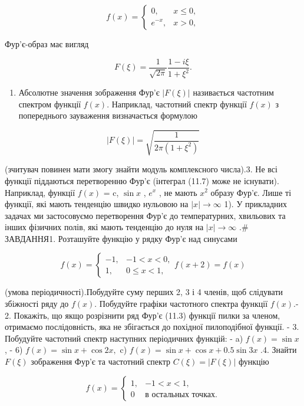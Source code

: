 \documentclass[
  ukrainian,
]{article}
\providecommand{\tightlist}{%
  \setlength{\itemsep}{0pt}\setlength{\parskip}{0pt}}
\begin{document}
\[
f(x) =
\begin{cases} 0, & x \le 0, \\ e^{-x}, & x > 0, \end{cases}
\]

Фур'є-образ має вигляд

\[
F(\xi) = \frac{1}{\sqrt{2\pi}} \frac{1 - i\xi}{1 + \xi^2}.
\]

\begin{enumerate}
\def\labelenumi{\arabic{enumi}.}
\setcounter{enumi}{1}
\tightlist
\item
  Абсолютне значення зображення Фур'є \(|F(\xi)|\) називається частотним
  спектром функції \(f(x)\). Наприклад, частотний спектр функції
  \(f(x)\) з попереднього зауваження визначається формулою
\end{enumerate}

\[
\left|F(\xi)\right| = \sqrt{\frac{1}{2\pi(1+\xi^2)}}
\]

(зчитувач повинен мати змогу знайти модуль комплексного числа).3. Не всі
функції піддаються перетворенню Фур'є (інтеграл (11.7) може не
існувати). Наприклад, функції \(f(x)\) = c, \(\sin x\) , \(e^x\) , не
мають \(x^2\) образу Фур'є. Лише ті функції, які мають тенденцію швидко
нульовою на \(|x| \to \infty\) 1). У прикладних задачах ми застосовуємо
перетворення Фур'є до температурних, хвильових та інших фізичних полів,
які мають тенденцію до нуля на \(|x| \to \infty\) .\# ЗАВДАННЯ1.
Розташуйте функцію у рядку Фур'є над синусами

\[
f(x) =
\begin{cases} -1, & -1 < x < 0, \\ 1, & 0 \le x < 1, \end{cases}
f(x+2) = f(x)
\]

(умова періодичності).Побудуйте суму перших 2, 3 і 4 членів, щоб
слідувати збіжності ряду до \(f(x)\). Побудуйте графіки частотного
спектра функції \(f(x)\).- 2. Покажіть, що якщо розрізнити ряд Фур'є
(11.3) функції пилки за членом, отримаємо послідовність, яка не
збігається до похідної пилоподібної функції. - 3. Побудуйте частотний
спектр наступних періодичних функцій: - a) \(f(x) = \sin x\) , - 6)
\(f(x) = \sin x + \cos 2x,\) c) \(f(x) = \sin x + \cos x + 0.5 \sin 3x\)
.4. Знайти \(F(\xi)\) зображення Фур'є та частотний спектр
\(C(\xi) = |F(\xi)|\) функцію

\[
f(x) =
\begin{cases} 1, & -1 < x < 1, \\ 0 & \text{в остальных точках.} \end{cases}
\]
\end{document}
